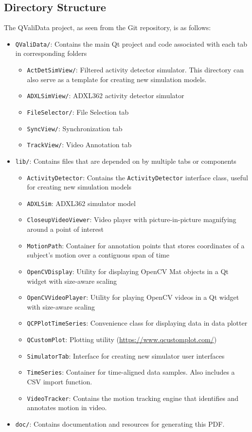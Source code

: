 \documentclass[]{article}
\begin{document}
	\subsection{Directory Structure}
	The QValiData project, as seen from the Git repository, is as follows:
		\begin{itemize}
			\item \texttt{QValiData/}: Contains the main Qt project and code associated with each tab in corresponding folders
				\begin{itemize}
					\item \texttt{ActDetSimView/}: Filtered activity detector simulator. This directory can also serve as a template for creating new simulation models.
					\item \texttt{ADXLSimView/}: ADXL362 activity detector simulator
					\item \texttt{FileSelector/}: File Selection tab
					\item \texttt{SyncView/}: Synchronization tab
					\item \texttt{TrackView/}: Video Annotation tab
				\end{itemize}
			\item \texttt{lib/}: Contains files that are depended on by multiple tabs or components
				\begin{itemize}
					\item \texttt{ActivityDetector}: Contains the \texttt{ActivityDetector} interface class, useful for creating new simulation models
					\item \texttt{ADXLSim}: ADXL362 simulator model
					\item \texttt{CloseupVideoViewer}: Video player with picture-in-picture magnifying around a point of interest
					\item \texttt{MotionPath}: Container for annotation points that stores coordinates of a subject's motion over a contiguous span of time
					\item \texttt{OpenCVDisplay}: Utility for displaying OpenCV Mat objects in a Qt widget with size-aware scaling
					\item \texttt{OpenCVVideoPlayer}: Utility for playing OpenCV videos in a Qt widget with size-aware scaling
					\item \texttt{QCPPlotTimeSeries}: Convenience class for displaying data in data plotter
					\item \texttt{QCustomPlot}: Plotting utility (\href{https://www.qcustomplot.com/}{https://www.qcustomplot.com/})
					\item \texttt{SimulatorTab}: Interface for creating new simulator user interfaces
					\item \texttt{TimeSeries}: Container for time-aligned data samples. Also includes a CSV import function.
					\item \texttt{VideoTracker}: Contains the motion tracking engine that identifies and annotates motion in video.
				\end{itemize}
			\item \texttt{doc/}: Contains documentation and resources for generating this PDF.
		\end{itemize}
\end{document}
